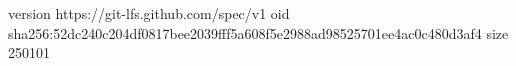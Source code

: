 version https://git-lfs.github.com/spec/v1
oid sha256:52dc240c204df0817bee2039fff5a608f5e2988ad98525701ee4ac0c480d3af4
size 250101
